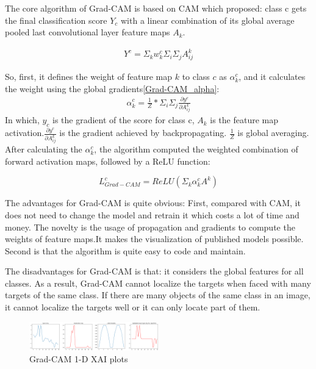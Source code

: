 \documentclass[conference]{IEEEtran}
\begin{document}
The core algorithm of Grad-CAM is based on CAM which proposed: class c gets the final classification score $Y_{c}$ with a linear combination of its global average pooled last convolutional layer feature maps $A_{k}$.

\begin{equation}
    \begin{aligned}
        Y^{c}=\Sigma_{k}w_{k}^{c}\Sigma_{i}\Sigma_{j}A_{ij}^{k}
        \label{Grad-CAM_Y}
    \end{aligned}
  \end{equation}

So, first, it defines the weight of feature map $k$ to class $c$ as $\alpha_{k}^{c}$, and it calculates the weight using the global gradients\ref{Grad-CAM_alpha}:
\begin{equation}
    \begin{aligned}
        \alpha_{k}^{c}=\frac{1}{Z}*\Sigma_{i}\Sigma_{j}\frac{\partial y^{c}}{\partial A_{ij}^{k}}
        \label{Grad-CAM_alpha}
    \end{aligned}
  \end{equation}
  In which, $y_{c}$ is the gradient of the score for class c, $A_{k}$ is the feature map activation.$\frac{\partial y^{c}}{\partial A_{ij}^{k}}$ is the gradient achieved by backpropagating. $\frac{1}{Z}$ is global averaging.
  After calculating the $\alpha_{k}^{c}$, the algorithm computed the weighted combination of forward activation maps, followed by a ReLU function:

$$L_{Grad-CAM}^{c}=ReLU(\Sigma_{k}\alpha_{k}^{c}A^{k})$$

The advantages for Grad-CAM is quite obvious: First, compared with CAM, it does not need to change the model and retrain it which costs a lot of time and money. 
The novelty is the usage of propagation and gradients to compute the weights of feature maps.It makes the visualization of published models possible. Second is that the algorithm is quite easy to code and maintain.\par
The disadvantages for Grad-CAM is that: it considers the global features for all classes. As a result, Grad-CAM cannot localize the targets when faced with many targets of the same class. If there are many objects of the same class in an image, it cannot localize the targets well or it can only locate part of them.

\begin{figure}[h] 
    \centering
    \includegraphics[width=0.5\textwidth]{./graphs/gd.png}
    \caption{Grad-CAM 1-D XAI plots} 
\end{figure}
\end{document}
